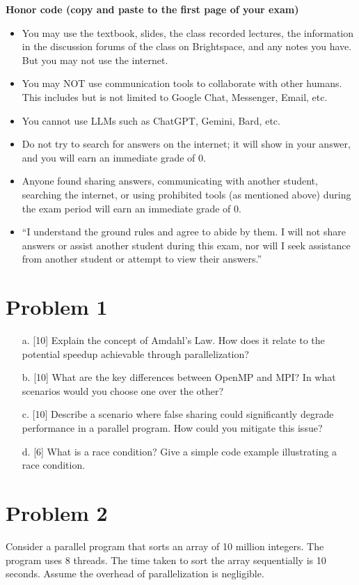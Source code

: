 \documentclass{article}
\begin{document}
\textbf{Honor code (copy and paste to the first page of your exam)}

\begin{itemize}
    \item You may use the textbook, slides, the class recorded lectures, the information in the discussion forums of the class on Brightspace, and any notes you have. But you may not use the internet.
    \item You may NOT use communication tools to collaborate with other humans. This includes but is not limited to Google Chat, Messenger, Email, etc.
    \item You cannot use LLMs such as ChatGPT, Gemini, Bard, etc.
    \item Do not try to search for answers on the internet; it will show in your answer, and you will earn an immediate grade of 0.
    \item Anyone found sharing answers, communicating with another student, searching the internet, or using prohibited tools (as mentioned above) during the exam period will earn an immediate grade of 0.
    \item “I understand the ground rules and agree to abide by them. I will not share answers or assist another student during this exam, nor will I seek assistance from another student or attempt to view their answers.”
\end{itemize}

\section*{Problem 1}
\begin{enumerate}
    \item[a.] [10]  Explain the concept of Amdahl's Law.  How does it relate to the potential speedup achievable through parallelization?
    \item[b.] [10] What are the key differences between OpenMP and MPI?  In what scenarios would you choose one over the other?
    \item[c.] [10] Describe a scenario where false sharing could significantly degrade performance in a parallel program.  How could you mitigate this issue?
    \item[d.] [6]  What is a race condition? Give a simple code example illustrating a race condition.
\end{enumerate}

\section*{Problem 2}
Consider a parallel program that sorts an array of 10 million integers. The program uses 8 threads. The time taken to sort the array sequentially is 10 seconds. Assume the overhead of parallelization is negligible.
\end{document}
